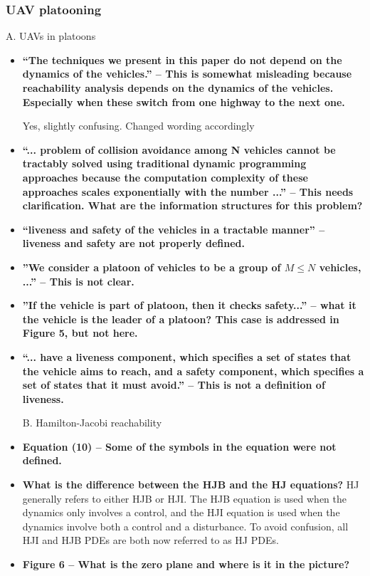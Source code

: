 \documentclass[submit]{aiaa-pretty}
\begin{document}
\subsubsection{UAV platooning}
A. UAVs in platoons
\begin{itemize}
\item \textbf{``The techniques we present in this paper do not depend on the dynamics of the vehicles.'' – This is somewhat misleading because reachability analysis depends on the dynamics of the vehicles. Especially when these switch from one highway to the next one.}

Yes, slightly confusing. Changed wording accordingly

\item \textbf{``... problem of collision avoidance among N vehicles cannot be tractably solved using traditional dynamic programming approaches because the computation complexity of these approaches scales exponentially with the number ...'' – This needs clarification. What are the information structures for this problem?}

\item \textbf{``liveness and safety of the vehicles in a tractable manner'' – liveness and safety are not properly defined.}
\item \textbf{''We consider a platoon of vehicles to be a group of $M \le N$ vehicles, ...'' – This is not clear.}
\item \textbf{''If the vehicle is part of platoon, then it checks safety...” – what it the vehicle is the leader of a platoon? This case is addressed in Figure 5, but not here.}
\item \textbf{``... have a liveness component, which specifies a set of states that the vehicle aims to reach, and a safety component, which specifies a set of states that it must avoid.'' – This is not a definition of liveness.}

B. Hamilton-Jacobi reachability
\item \textbf{Equation (10) – Some of the symbols in the equation were not defined.}
\item \textbf{What is the difference between the HJB and the HJ equations?}
HJ generally refers to either HJB or HJI. The HJB equation is used when the dynamics only involves a control, and the HJI equation is used when the dynamics involve both a control and a disturbance. To avoid confusion, all HJI and HJB PDEs are both now referred to as HJ PDEs.

\item \textbf{Figure 6 – What is the zero plane and where is it in the picture?}
\end{itemize}
\end{document}
